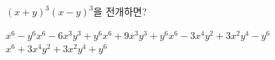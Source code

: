 $(x+y)^3(x-y)^3$을 전개하면?
\begin{choicesii}{$x^6-y^6$}{$x^6-6x^3y^3+y^6$}{$x^6+9x^3y^3+y^6$}{$x^6-3x^4y^2+3x^2y^4-y^6$}{$x^6+3x^4y^2+3x^2y^4+y^6$}\end{choicesii}
